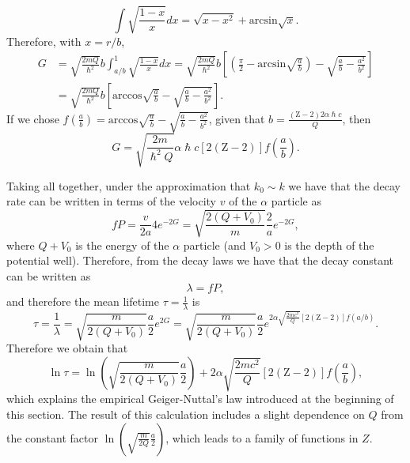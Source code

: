 \begin{equation*}
    \int\sqrt{\frac{1-x}{x}}dx = \sqrt{x-x^2}+\mbox{arcsin}\sqrt{x}.
\end{equation*}
Therefore, with \(x=r/b\), 
\begin{equation*}
    \begin{split}
    G & = \sqrt{\frac{2mQ}{\hslash^2}}b\int_{a/b}^1\sqrt{\frac{1-x}{x}}dx = \sqrt{\frac{2mQ}{\hslash^2}}b\left[\left(\frac{\pi}{2}-\mbox{arcsin}\sqrt{\frac{a}{b}}\right)-\sqrt{\frac{a}{b}-\frac{a^2}{b^2}}\right] \\&= \sqrt{\frac{2mQ}{\hslash^2}}b \left[\mbox{arccos}\sqrt{\frac{a}{b}}-\sqrt{\frac{a}{b}-\frac{a^2}{b^2}}\right].
    \end{split}
\end{equation*}
If we chose $f\left(\frac{a}{b}\right) = \mbox{arccos}\sqrt{\frac{a}{b}}-\sqrt{\frac{a}{b}-\frac{a^2}{b^2}}$, given that $b = \frac{(\mbox{Z}-2)2\alpha\hslash c}{Q}$, then
\begin{equation*}
    G = \sqrt{\frac{2m}{\hslash^2Q}}\alpha\hslash c \left[2(\mbox{Z}-2) \right]f\left(\frac{a}{b}\right).
\end{equation*}

Taking all together, under the approximation that $k_0 \sim k$ we have that the decay rate can be written in terms of the velocity $v$ of the $\alpha$ particle as
\begin{equation*}
    fP = \frac{v}{2a}4e^{-2G} = \sqrt{\frac{2(Q+V_0)}{m}}\frac{2}{a}e^{-2G},
\end{equation*}
where \(Q+V_0\) is the energy of the \(\alpha\) particle (and \(V_0>0\) is the depth of the potential well).
Therefore, from the decay laws we have that the decay constant can be written as
\begin{equation*}
    \lambda = fP,
\end{equation*}
and therefore the mean lifetime  $\tau = \frac{1}{\lambda}$ is
\begin{equation*}
    \tau = \frac{1}{\lambda} = \sqrt{\frac{m}{2(Q+V_0)}}\frac{a}{2}e^{2G} = \sqrt{\frac{m}{2(Q+V_0)}}\frac{a}{2}e^{2\alpha\sqrt{\frac{2mc^2}{Q}}[2(\mbox{Z}-2)]f(a/b)}.
\end{equation*}
Therefore we obtain that
\begin{equation*}
    \ln\tau = \ln\left(\sqrt{\frac{m}{2(Q+V_0)}}\frac{a}{2}\right)+2\alpha\sqrt{\frac{2mc^2}{Q}}\left[2(\mbox{Z}-2)\right]f\left(\frac{a}{b}\right),
\end{equation*}
which explains the empirical Geiger-Nuttal's law introduced at the beginning of this section. The result of this calculation includes a slight dependence on \(Q\) from the constant factor $\ln\left(\sqrt{\frac{m}{2Q}}\frac{a}{2}\right)$, which leads to a family of functions in \(Z\).

